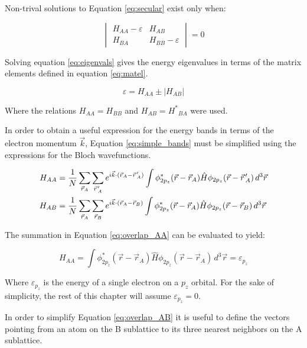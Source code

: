 Non-trival solutions to Equation \ref{eq:secular} exist only when:

\begin{equation}
\label{eq:eigenvals}
    \begin{vmatrix} H_{AA}-\varepsilon & H_{AB} \\ H_{BA} & H_{BB}-\varepsilon \end{vmatrix} = 0
\end{equation}

Solving equation \ref{eq:eigenvals} gives the energy eigenvalues in terms of the matrix elements defined in equation \ref{eq:matel}.

\begin{equation}
\label{eq:simple_bands}
    \varepsilon = H_{AA} \pm \lvert H_{AB} \rvert
\end{equation}

Where the relations $H_{AA} = H_{BB}$ and $H_{AB} = {H^*}_{BA}$ were used.

In order to obtain a useful expression for the energy bands in terms of the electron momentum $\vec{k}$, Equation \ref{eq:simple_bands} must be simplified using the expressions for the Bloch wavefunctions. 

\begin{align}
    H_{AA} &= \frac{1}{N} \sum_{\vec{r}_A}^{} \sum_{\pvec{r}'_A}^{} e^{i \vec{k}\cdot(\vec{r}_A - \pvec{r}'_A)} \int \phi^*_{2p_z}(\vec{r}-\vec{r}_A) \hat{H} \phi_{2p_z}(\vec{r}-\pvec{r}'_A) \, d^3\vec{r} \label{eq:overlap_AA} \\
    H_{AB} &= \frac{1}{N} \sum_{\vec{r}_A}^{} \sum_{\vec{r}_B}^{} e^{i \vec{k}\cdot(\vec{r}_A - \vec{r}_B)} \int \phi^*_{2p_z}(\vec{r}-\vec{r}_A) \hat{H} \phi_{2p_z}(\vec{r}-\vec{r}_B) \, d^3\vec{r} \label{eq:overlap_AB}
\end{align}

The summation in Equation \ref{eq:overlap_AA} can be evaluated to yield:

\begin{equation}
\label{eq:pz_energy}
    H_{AA} = \int \phi^*_{2p_z}(\vec{r}-\vec{r}_A) \hat{H} \phi_{2p_z}(\vec{r}-\vec{r}_A) \, d^3\vec{r} = \varepsilon_{p_z}
\end{equation}

Where $\varepsilon_{p_z}$ is the energy of a single electron on a $p_z$ orbital. For the sake of simplicity, the rest of this chapter will assume $\varepsilon_{p_z} = 0$. 

In order to simplify Equation \ref{eq:overlap_AB} it is useful to define the vectors pointing from an atom on the B sublattice to its three nearest neighbors on the A sublattice.

